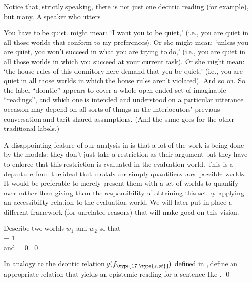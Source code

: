 Notice that, strictly speaking, there is not just one deontic reading (for
example), but many. A speaker who utters

\ex You have to be quiet. \xe
%
might mean: `I want you to be quiet,' (i.e., you are quiet in all those worlds
that conform to my preferences). Or she might mean: `unless you are quiet, you
won't succeed in what you are trying to do,' (i.e., you are quiet in all those
worlds in which you succeed at your current task). Or she might mean: `the house
rules of this dormitory here demand that you be quiet,' (i.e., you are quiet in
all those worlds in which the house rules aren't violated). And so on. %
%
So the label ``deontic'' appears to cover a whole open-ended set of imaginable
``readings'', and which one is intended and understood on a particular utterance
occasion may depend on all sorts of things in the interlocutors' previous
conversation and tacit shared assumptions. (And the same goes for the other
traditional labels.)

A disappointing feature of our analysis in  is that a lot of
the work is being done by the modals: they don't just take a restriction as
their argument but they have to enforce that this restriction is evaluated in
the evaluation world. This is a departure from the ideal that modals are simply
quantifiers over possible worlds. It would be preferable to merely present them
with a set of worlds to quantify over rather than giving them the responsibility
of obtaining this set by applying an accessibility relation to the evaluation
world. We will later put in place a different framework (for unrelated reasons)
that will make good on this vision.

\begin{exercise}	
	Describe two worlds $w_{1}$ and $w_{2}$ so that\\
	 = 1\\
  and  = 0. \qed
\end{exercise}
\begin{exercise}
	
	In analogy to the deontic relation
  $g(f_{\type{17,\type{s,st}}})$ defined in , define an
  appropriate relation that yields an epistemic reading for a sentence
  like . \qed
\end{exercise}

